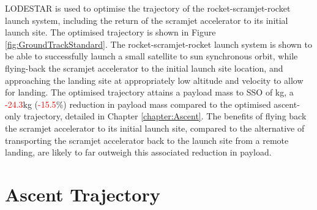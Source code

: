 LODESTAR is used to optimise the trajectory of the rocket-scramjet-rocket launch system, including the return of the scramjet accelerator to its initial launch site. The optimised trajectory is shown in Figure \ref{fig:GroundTrackStandard}. 
The rocket-scramjet-rocket launch system is shown to be able to successfully launch a small satellite to sun synchronous orbit, 
while flying-back the scramjet accelerator to the initial launch site location, and approaching the landing site at appropriately low altitude and velocity to allow for landing. 
The optimised trajectory attains a payload mass to SSO of \PayloadToOrbitStandard kg, a \textcolor{red}{-24.3}kg (\textcolor{red}{-15.5}\%) reduction in payload mass compared to the optimised ascent-only trajectory, detailed in Chapter \ref{chapter:Ascent}. 
The benefits of flying back the scramjet accelerator to its initial launch site, compared to the alternative of transporting the scramjet accelerator back to the launch site from a remote landing, are likely to far outweigh this associated reduction in payload. 



\section{Ascent Trajectory}

